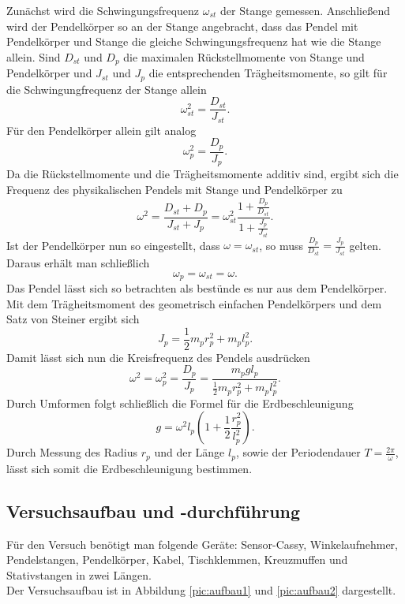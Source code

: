 Zunächst wird die Schwingungsfrequenz $\omega_{st}$ der Stange gemessen. Anschließend wird der Pendelkörper so an der Stange angebracht, dass das Pendel mit Pendelkörper und Stange die gleiche Schwingungsfrequenz hat wie die Stange allein. Sind $D_{st}$ und $D_p$ die maximalen Rückstellmomente von Stange und Pendelkörper und $J_{st}$ und $J_p$ die entsprechenden Trägheitsmomente, so gilt für die Schwingungfrequenz der Stange allein
$$\omega_{st}^2 = \frac{D_{st}}{J_{st}}\text{.}$$
Für den Pendelkörper allein gilt analog
$$\omega_p^2 = \frac{D_p}{J_p}\text{.}$$
Da die Rückstellmomente und die Trägheitsmomente additiv sind, ergibt sich die Frequenz des physikalischen Pendels mit Stange und Pendelkörper zu
$$\omega^2 = \frac{D_{st} + D_p}{J_{st} + J_p} = \omega_{st}^2 \frac{1+\frac{D_p}{D_{st}}}{1+\frac{J_p}{J_{st}}}\text{.}$$
Ist der Pendelkörper nun so eingestellt, dass $\omega = \omega_{st}$, so muss $\frac{D_p}{D_{st}} = \frac{J_p}{J_{st}}$ gelten. Daraus erhält man schließlich
$$\omega_p = \omega_{st} = \omega\text{.}$$
Das Pendel lässt sich so betrachten als bestünde es nur aus dem Pendelkörper. Mit dem Trägheitsmoment des geometrisch einfachen Pendelkörpers und dem Satz von Steiner ergibt sich
$$J_p = \frac 12 m_p r_p^2 + m_pl_p^2\text{.}$$
Damit lässt sich nun die Kreisfrequenz des Pendels ausdrücken
$$\omega^2 = \omega_p^2 = \frac{D_p}{J_p} = \frac{m_pgl_p}{\frac 12 m_pr_p^2+m_pl_p^2}\text{.}$$
Durch Umformen folgt schließlich die Formel für die Erdbeschleunigung
$$g = \omega^2l_p \left( 1 + \frac 12 \frac{r_p^2}{l_p^2} \right)\text{.}$$
Durch Messung des Radius $r_p$ und der Länge $l_p$, sowie der Periodendauer $T = \frac{2\pi}{\omega}$, lässt sich somit die Erdbeschleunigung bestimmen.

\subsection{Versuchsaufbau und -durchführung}
Für den Versuch benötigt man folgende Geräte: Sensor-Cassy, Winkelaufnehmer, Pendelstangen, Pendelkörper, Kabel, Tischklemmen, Kreuzmuffen und  Stativstangen in zwei Längen. \\
Der Versuchsaufbau ist in Abbildung \ref{pic:aufbau1} und \ref{pic:aufbau2} dargestellt.

